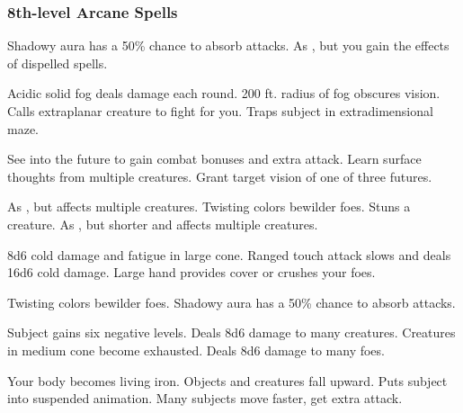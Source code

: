 \subsubsection{8th-level Arcane Spells} 
\begin{swspelllist}
     Shadowy aura has a 50\% chance to absorb attacks. 
   As , but you gain the effects of dispelled spells.

   Acidic solid fog deals damage each round.
   200 ft. radius of fog obscures vision.
   Calls extraplanar creature to fight for you.
   Traps subject in extradimensional maze.

   See into the future to gain combat bonuses and extra attack.
   Learn surface thoughts from multiple creatures.
   Grant target vision of one of three futures.

   As , but affects multiple creatures.
   Twisting colors bewilder foes.
   Stuns a creature.
   As , but shorter and affects multiple creatures.

   8d6 cold damage and fatigue in large cone.
   Ranged touch attack slows and deals 16d6 cold damage.
  \spellhead{}
   Large hand provides cover or crushes your foes.

   Twisting colors bewilder foes.
     Shadowy aura has a 50\% chance to absorb attacks. 
  \spellheadrestricted{}

   Subject gains six negative levels.
   Deals 8d6 damage to many creatures.
   Creatures in medium cone become exhausted.
   Deals 8d6 damage to many foes.

   Your body becomes living iron.
   Objects and creatures fall upward.
  \M Puts subject into suspended animation.
   Many subjects move faster, get extra attack.
\end{swspelllist}

